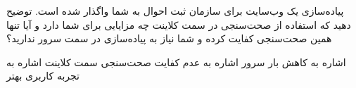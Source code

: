 
پیاده‌سازی یک وب‌سایت برای سازمان ثبت احوال به شما واگذار شده است.
توضیح دهید که استفاده از صحت‌سنجی در سمت کلاینت چه مزایایی برای شما دارد و آیا تنها همین صحت‌سنجی کفایت کرده و شما نیاز به پیاده‌سازی در سمت سرور ندارید؟


\begin{پاسخ}
 اشاره به کاهش بار سرور
 اشاره به عدم کفایت صحت‌سنجی سمت کلاینت
 اشاره به تجربه کاربری بهتر
\end{پاسخ}
